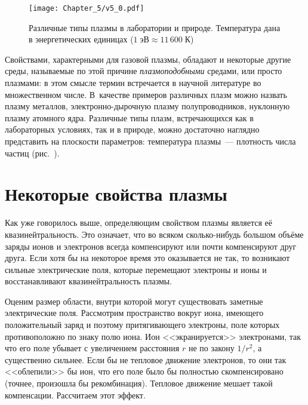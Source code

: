 \begin{figure}[t]
    \centering
	\texttt{[image: Chapter\_5/v5\_0.pdf]}
	\caption{Различные типы плазмы в лаборатории и природе. Температура
    дана в энергетических единицах ($1\;эВ\approx 11\,600\;К$)}
\end{figure}

Свойствами, характерными для газовой плазмы, обладают и некоторые другие среды,
называемые по этой причине
\emph{плазмоподобными} средами, или просто плазмами: в этом смысле термин
 встречается в научной литературе во множественном числе.
В~качестве примеров различных плазм можно назвать плазму металлов,
электронно-дырочную плазму полупроводников, нуклонную плазму атомного ядра.
Различные типы плазм, встречающихся как в лабораторных условиях,
так и в природе, можно достаточно наглядно представить на плоскости параметров:
температура плазмы~--- плотность числа частиц (рис.~).

\section{Некоторые свойства плазмы}

Как уже говорилось выше, определяющим свойством плазмы является её
квазинейтральность. Это означает, что во всяком
сколько-нибудь большом объёме заряды ионов и электронов всегда компенсируют или
почти компенсируют друг друга. Если хотя
бы на некоторое время это оказывается не так, то возникают сильные электрические
поля, которые перемещают электроны и
ионы и восстанавливают квазинейтральность плазмы.

Оценим размер области, внутри которой могут существовать заметные электрические
поля. Рассмотрим пространство вокруг
иона, имеющего положительный заряд и поэтому притягивающего электроны, поле
которых противоположно по знаку полю иона.
Ион <<экранируется>> электронами, так что его поле убывает с увеличением
расстояния $r$ не по закону $1/r^2$, а
существенно сильнее. Если бы не тепловое движение электронов, то они так
<<облепили>> бы ион, что его поле было бы
полностью скомпенсировано (точнее, произошла бы рекомбинация). Тепловое движение
мешает такой компенсации. Рассчитаем
этот эффект.

